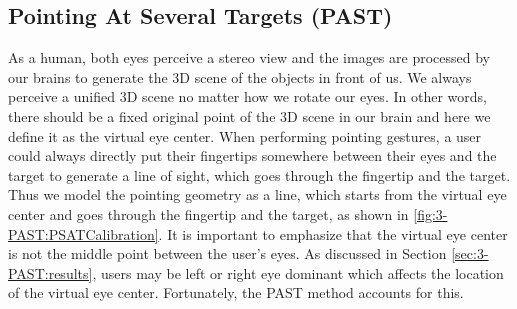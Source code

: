 \subsection{Pointing At Several Targets (PAST)} \label{sec:3-PAST:PAST}
As a human, both eyes perceive a stereo view and the images are processed by our brains to generate the 3D scene of the objects in front of us. We always perceive a unified 3D scene no matter how we rotate our eyes. In other words, there should be a fixed original point of the 3D scene in our brain and here we define it as the virtual eye center. When performing pointing gestures, a user could always directly put their fingertips somewhere between their eyes and the target to generate a line of sight, which goes through the fingertip and the target. Thus we model the pointing geometry as a line, which starts from the virtual eye center and goes through the fingertip and the target, as shown in \figurename{ \ref{fig:3-PAST:PSATCalibration}}. It is important to emphasize that the virtual eye center is not the middle point between the user's eyes. As discussed in Section \ref{sec:3-PAST:results}, users may be left or right eye dominant which affects the location of the virtual eye center. Fortunately, the PAST method accounts for this.

